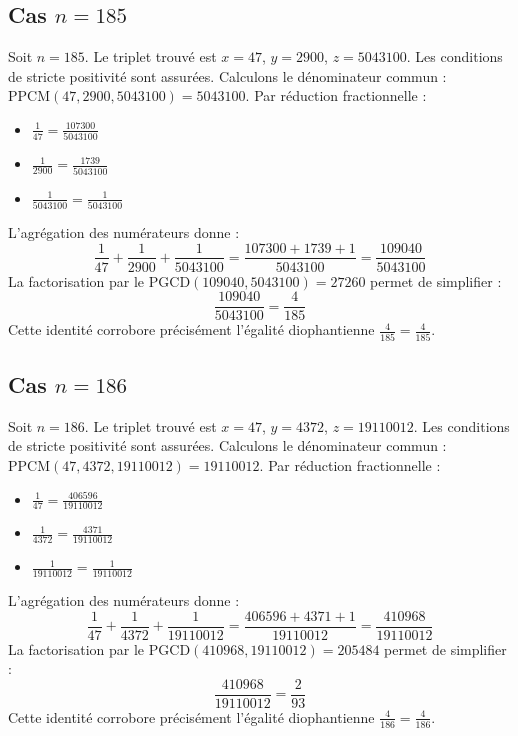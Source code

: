\documentclass[11pt,a4paper]{article}
\begin{document}
\subsection{Cas $n = 185$}
Soit $n = 185$. Le triplet trouvé est $x = 47$, $y = 2900$, $z = 5043100$.
Les conditions de stricte positivité sont assurées.
Calculons le dénominateur commun : $\text{PPCM}(47, 2900, 5043100) = 5043100$.
Par réduction fractionnelle :
\begin{itemize}
    \item $\frac{1}{47} = \frac{107300}{5043100}$
    \item $\frac{1}{2900} = \frac{1739}{5043100}$
    \item $\frac{1}{5043100} = \frac{1}{5043100}$
\end{itemize}
L'agrégation des numérateurs donne :
$$ \frac{1}{47} + \frac{1}{2900} + \frac{1}{5043100} = \frac{107300 + 1739 + 1}{5043100} = \frac{109040}{5043100} $$
La factorisation par le $\text{PGCD}(109040, 5043100) = 27260$ permet de simplifier :
$$ \frac{109040}{5043100} = \frac{4}{185} $$
Cette identité corrobore précisément l'égalité diophantienne $\frac{4}{185} = \frac{4}{185}$.

\subsection{Cas $n = 186$}
Soit $n = 186$. Le triplet trouvé est $x = 47$, $y = 4372$, $z = 19110012$.
Les conditions de stricte positivité sont assurées.
Calculons le dénominateur commun : $\text{PPCM}(47, 4372, 19110012) = 19110012$.
Par réduction fractionnelle :
\begin{itemize}
    \item $\frac{1}{47} = \frac{406596}{19110012}$
    \item $\frac{1}{4372} = \frac{4371}{19110012}$
    \item $\frac{1}{19110012} = \frac{1}{19110012}$
\end{itemize}
L'agrégation des numérateurs donne :
$$ \frac{1}{47} + \frac{1}{4372} + \frac{1}{19110012} = \frac{406596 + 4371 + 1}{19110012} = \frac{410968}{19110012} $$
La factorisation par le $\text{PGCD}(410968, 19110012) = 205484$ permet de simplifier :
$$ \frac{410968}{19110012} = \frac{2}{93} $$
Cette identité corrobore précisément l'égalité diophantienne $\frac{4}{186} = \frac{4}{186}$.
\end{document}
